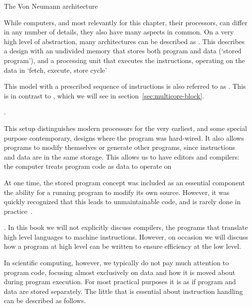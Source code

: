  {The Von Neumann architecture}
\label{sec:vonneuman}

While computers, and most relevantly for this chapter, their
processors, can differ in any number of details, they also have many
aspects in common. On a very high level of abstraction, many
architectures can be described as .
This describes a design with an undivided memory
that stores both program and data (`stored program'), and a processing
unit that executes the instructions, operating on the data in `fetch,
execute, store cycle'
\begin{footnoteenv}
  {This model with a prescribed sequence
  of instructions is also referred to as .
  This is in contrast to , which we will
  see in section~\ref{sec:multicore-block}.}
\end{footnoteenv}%
.

This setup distinguishes modern processors for the very earliest, and
some special purpose contemporary, designs where the program was
hard-wired. It also allows programs to modify themselves or generate
other programs, since instructions and data are in the same
storage. This allows us to have editors and compilers: the computer
treats program code as data to operate on
\begin{footnoteenv}
  {At one time, the
  stored program concept was included as an essential component the
  ability for a running program to modify its own source. However, it
  was quickly recognized that this leads to unmaintainable code, and
  is rarely done in practice~\cite{EWD:EWD117}.}
\end{footnoteenv}%
. In this book we will
not explicitly discuss compilers, the programs that translate high
level languages to machine instructions. However, on occasion we will
discuss how a program at high level can be written to ensure
efficiency at the low level.

In scientific computing, however, we typically do not pay much
attention to program code, focusing almost exclusively on data and how
it is moved about during program execution.  For most practical
purposes it is as if program and data are stored separately. The
little that is essential about instruction handling can be described
as follows.

